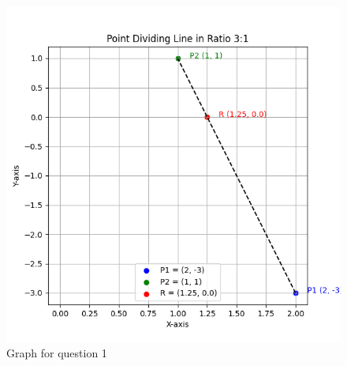 \documentclass[journal]{IEEEtran}
\begin{document}
\begin{figure}[ht!]
\centering
\includegraphics[height=0.5\textheight, keepaspectratio]{figs/q1.png}
\caption{Graph for question 1}
\end{figure}
\end{document}
